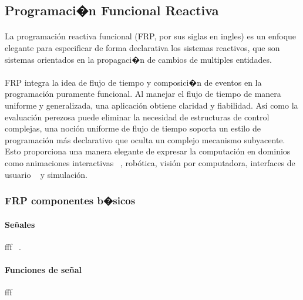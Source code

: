 \documentclass{standalone}
\begin{document}
\subsection{Programaci�n Funcional Reactiva}

\paragraph{}
La programación reactiva funcional (FRP, por sus siglas en ingles) es un enfoque elegante para especificar de forma declarativa los sistemas reactivos, que son sistemas orientados en la propagaci�n de cambios de multiples entidades.

\paragraph{}
FRP integra la idea de flujo de tiempo y composici�n de eventos en la programación puramente funcional. Al manejar el flujo de tiempo de manera uniforme y generalizada, una aplicación obtiene claridad y fiabilidad. Así como la evaluación perezosa puede eliminar la necesidad de estructuras de control complejas, una noción uniforme de flujo de tiempo soporta un estilo de programación más declarativo que oculta un complejo mecanismo subyacente. Esto proporciona una manera elegante de expresar la computación en dominios como animaciones interactivas ~\cite{eh97:fran}, robótica, visión por computadora, interfaces de usuario ~\cite{eh97:fran} y simulación.

\subsubsection{FRP componentes b�sicos}

\paragraph{Señales}
fff ~\cite{Courtney2003b}.

\paragraph{Funciones de señal}
fff
\end{document}
